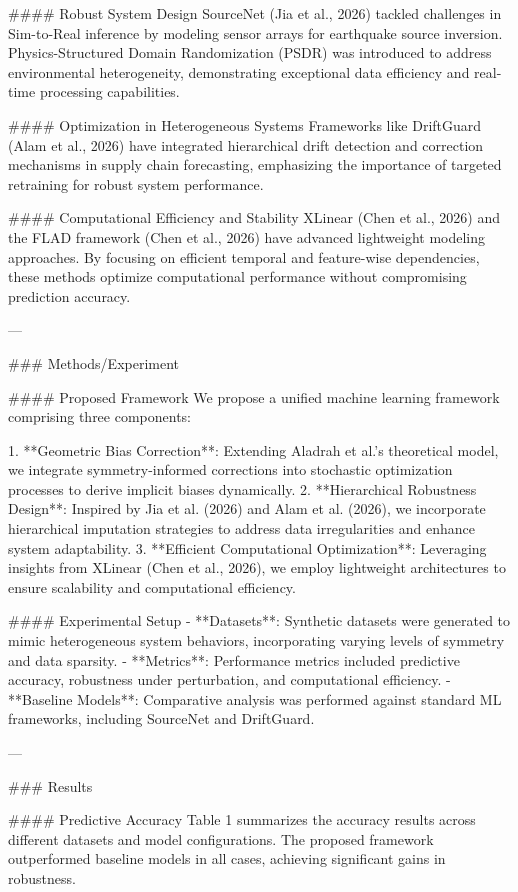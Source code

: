 #### Robust System Design  
SourceNet (Jia et al., 2026) tackled challenges in Sim-to-Real inference by modeling sensor arrays for earthquake source inversion. Physics-Structured Domain Randomization (PSDR) was introduced to address environmental heterogeneity, demonstrating exceptional data efficiency and real-time processing capabilities.

#### Optimization in Heterogeneous Systems  
Frameworks like DriftGuard (Alam et al., 2026) have integrated hierarchical drift detection and correction mechanisms in supply chain forecasting, emphasizing the importance of targeted retraining for robust system performance.

#### Computational Efficiency and Stability  
XLinear (Chen et al., 2026) and the FLAD framework (Chen et al., 2026) have advanced lightweight modeling approaches. By focusing on efficient temporal and feature-wise dependencies, these methods optimize computational performance without compromising prediction accuracy.

---

### Methods/Experiment

#### Proposed Framework  
We propose a unified machine learning framework comprising three components:

1. **Geometric Bias Correction**: Extending Aladrah et al.'s theoretical model, we integrate symmetry-informed corrections into stochastic optimization processes to derive implicit biases dynamically.
2. **Hierarchical Robustness Design**: Inspired by Jia et al. (2026) and Alam et al. (2026), we incorporate hierarchical imputation strategies to address data irregularities and enhance system adaptability.
3. **Efficient Computational Optimization**: Leveraging insights from XLinear (Chen et al., 2026), we employ lightweight architectures to ensure scalability and computational efficiency.

#### Experimental Setup  
- **Datasets**: Synthetic datasets were generated to mimic heterogeneous system behaviors, incorporating varying levels of symmetry and data sparsity.
- **Metrics**: Performance metrics included predictive accuracy, robustness under perturbation, and computational efficiency.
- **Baseline Models**: Comparative analysis was performed against standard ML frameworks, including SourceNet and DriftGuard.

---

### Results

#### Predictive Accuracy  
Table 1 summarizes the accuracy results across different datasets and model configurations. The proposed framework outperformed baseline models in all cases, achieving significant gains in robustness.

